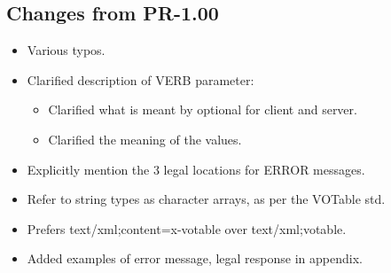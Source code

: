 \documentclass[11pt,a4paper]{ivoa}
\begin{document}
\subsection*{Changes from PR-1.00}
\begin{itemize}
	\item Various typos.
	\item Clarified description of VERB parameter:
		\begin{itemize}
			\item Clarified what is meant by optional for client and server.
			\item Clarified the meaning of the values.
		\end{itemize}
	\item Explicitly mention the 3 legal locations for ERROR messages.
	\item Refer to string types as character arrays, as per the VOTable std.
	\item Prefers text/xml;content=x-votable over text/xml;votable.
	\item Added examples of error message, legal response in appendix.
\end{itemize}
\end{document}
